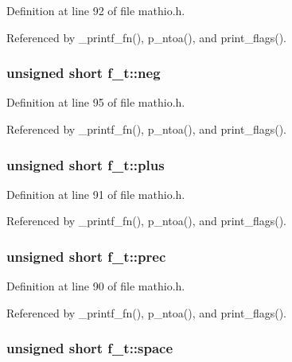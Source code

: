 Definition at line 92 of file mathio.\+h.



Referenced by \+\_\+printf\+\_\+fn(), p\+\_\+ntoa(), and print\+\_\+flags().

\subsubsection[{\texorpdfstring{neg}{neg}}]{\setlength{\rightskip}{0pt plus 5cm}unsigned short f\+\_\+t\+::neg}\hypertarget{unionf__t_a08d5e77f0fdb784ab1ef1425625e23f7}{}\label{unionf__t_a08d5e77f0fdb784ab1ef1425625e23f7}


Definition at line 95 of file mathio.\+h.



Referenced by \+\_\+printf\+\_\+fn(), p\+\_\+ntoa(), and print\+\_\+flags().

\subsubsection[{\texorpdfstring{plus}{plus}}]{\setlength{\rightskip}{0pt plus 5cm}unsigned short f\+\_\+t\+::plus}\hypertarget{unionf__t_a63ebe04d55417685e439b779dfa8dafe}{}\label{unionf__t_a63ebe04d55417685e439b779dfa8dafe}


Definition at line 91 of file mathio.\+h.



Referenced by \+\_\+printf\+\_\+fn(), p\+\_\+ntoa(), and print\+\_\+flags().

\subsubsection[{\texorpdfstring{prec}{prec}}]{\setlength{\rightskip}{0pt plus 5cm}unsigned short f\+\_\+t\+::prec}\hypertarget{unionf__t_afd9cfffafc044b616256b483e5444d92}{}\label{unionf__t_afd9cfffafc044b616256b483e5444d92}


Definition at line 90 of file mathio.\+h.



Referenced by \+\_\+printf\+\_\+fn(), p\+\_\+ntoa(), and print\+\_\+flags().

\subsubsection[{\texorpdfstring{space}{space}}]{\setlength{\rightskip}{0pt plus 5cm}unsigned short f\+\_\+t\+::space}\hypertarget{unionf__t_aba20a97e95d14a076e9c175989022717}{}\label{unionf__t_aba20a97e95d14a076e9c175989022717}


